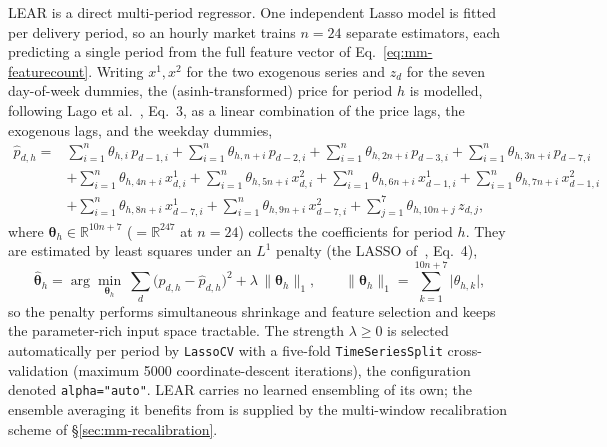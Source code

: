 LEAR is a direct multi-period regressor. One independent Lasso model is fitted
per delivery period, so an hourly market trains $n{=}24$ separate estimators,
each predicting a single period from the full feature vector of
Eq.~\eqref{eq:mm-featurecount}. Writing $x^1,x^2$ for the two exogenous series
and $z_d$ for the seven day-of-week dummies, the (asinh-transformed) price for
period $h$ is modelled, following Lago et al.~\cite{lago2021}, Eq.~3, as a linear
combination of the price lags, the exogenous lags, and the weekday dummies,
\begin{equation}
\begin{aligned}
  \hat{p}_{d,h} = {}
   & \sum_{i=1}^{n}\theta_{h,i}\,p_{d-1,i}
   + \sum_{i=1}^{n}\theta_{h,n+i}\,p_{d-2,i}
   + \sum_{i=1}^{n}\theta_{h,2n+i}\,p_{d-3,i}
   + \sum_{i=1}^{n}\theta_{h,3n+i}\,p_{d-7,i} \\[2pt]
   & + \sum_{i=1}^{n}\theta_{h,4n+i}\,x^{1}_{d,i}
   + \sum_{i=1}^{n}\theta_{h,5n+i}\,x^{2}_{d,i}
   + \sum_{i=1}^{n}\theta_{h,6n+i}\,x^{1}_{d-1,i}
   + \sum_{i=1}^{n}\theta_{h,7n+i}\,x^{2}_{d-1,i} \\[2pt]
   & + \sum_{i=1}^{n}\theta_{h,8n+i}\,x^{1}_{d-7,i}
   + \sum_{i=1}^{n}\theta_{h,9n+i}\,x^{2}_{d-7,i}
   + \sum_{j=1}^{7}\theta_{h,10n+j}\,z_{d,j},
\end{aligned}
\label{eq:mm-lear}
\end{equation}
where $\boldsymbol{\theta}_h\in\mathbb{R}^{10n+7}$ ($=\mathbb{R}^{247}$ at
$n{=}24$) collects the coefficients for period $h$. They are estimated by least
squares under an $L^1$ penalty (the LASSO of~\cite{lago2021}, Eq.~4),
\begin{equation}
  \hat{\boldsymbol{\theta}}_h
   = \arg\min_{\boldsymbol{\theta}_h}\
     \sum_{d}\bigl(p_{d,h}-\hat{p}_{d,h}\bigr)^2
     + \lambda\,\lVert\boldsymbol{\theta}_h\rVert_1,
   \qquad
   \lVert\boldsymbol{\theta}_h\rVert_1=\sum_{k=1}^{10n+7}\lvert\theta_{h,k}\rvert ,
\label{eq:mm-lasso}
\end{equation}
so the penalty performs simultaneous shrinkage and feature selection and keeps
the parameter-rich input space tractable. The strength $\lambda\ge0$ is selected
automatically per period by \texttt{LassoCV} with a five-fold
\texttt{TimeSeriesSplit} cross-validation (maximum 5000 coordinate-descent
iterations), the configuration denoted \texttt{alpha="auto"}. LEAR carries no
learned ensembling of its own; the ensemble averaging it benefits from is
supplied by the multi-window recalibration scheme of
\S\ref{sec:mm-recalibration}.

